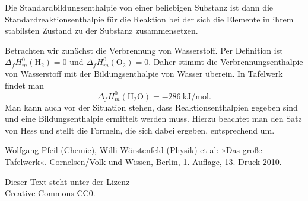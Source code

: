 \documentclass[a4paper,11pt,fleqn,twocolumn,dvipdfmx]{scrartcl}
\newcommand{\unit}[1]{\mathrm{#1}}
\begin{document}
Die Standardbildungsenthalpie von einer beliebigen Substanz
ist dann die Standardreaktionsenthalpie für die Reaktion bei der
sich die Elemente in ihrem stabilsten Zustand
zu der Substanz zusammensetzen.

Betrachten wir zunächst die Verbrennung von Wasserstoff.
Per Definition ist $\Delta_f H_m^0(\mathrm{H_2})=0$
und $\Delta_f H_m^0(\mathrm{O_2})=0$. Daher stimmt die
Verbrennungsenthalpie von Wasserstoff mit der Bildungsenthalpie
von Wasser überein. In Tafelwerk \cite{Cornelsen} findet man%
\[\Delta_f H_m^0 (\mathrm{H_2O}) = -286\:\unit{kJ/mol}.\]
Man kann auch vor der Situation stehen, dass Reaktionsenthalpien
gegeben sind und eine Bildungsenthalpie ermittelt werden muss.
Hierzu beachtet man den Satz von Hess und stellt die Formeln,
die sich dabei ergeben, entsprechend um.

\begin{thebibliography}{xx}
\setlength{\itemsep}{0pt}
 Wolfgang Pfeil (Chemie), Willi Wörstenfeld (Physik)
et al:
»Das große Tafelwerk«.
Cornelsen/Volk und Wissen, Berlin, 1. Auflage, 13. Druck 2010.
\end{thebibliography}

\vfill

\noindent
{\small Dieser Text steht unter der Lizenz\\
Creative Commons CC0.}
\end{document}
